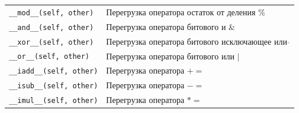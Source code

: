 \begin{table}[h!]
\begin{longtable}{|p{7cm}|p{8cm}|}
\texttt{\_\_mod\_\_(self, other)} & Перегрузка оператора остаток от деления $\%$ \\





\texttt{\_\_and\_\_(self, other)} & Перегрузка оператора битового и $\&$ \\

\texttt{\_\_xor\_\_(self, other)} & Перегрузка оператора битового исключающее или $\hat{}$\\

\texttt{\_\_or\_\_(self, other)} & Перегрузка оператора битового или $|$ \\

\texttt{\_\_iadd\_\_(self, other)} & Перегрузка оператора $+=$ \\

\texttt{\_\_isub\_\_(self, other)}  & Перегрузка оператора $-=$ \\

\texttt{\_\_imul\_\_(self, other)}  & Перегрузка оператора $*=$ \\\hline








\end{longtable}
\end{table}
